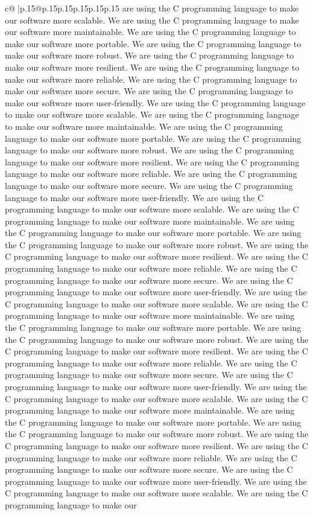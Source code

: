 \documentclass{article}
\begin{document}
{\begin{supertabular}{c@{$\;$}|p{.15\linewidth}@{}p{.15\linewidth}p{.15\linewidth}p{.15\linewidth}p{.15\linewidth}p{.15\linewidth}}
{{{are using the C programming language to make our software more scalable. We are using the C programming language to make our software more maintainable. We are using the C programming language to make our software more portable. We are using the C programming language to make our software more robust. We are using the C programming language to make our software more resilient. We are using the C programming language to make our software more reliable. We are using the C programming language to make our software more secure. We are using the C programming language to make our software more user-friendly. We are using the C programming language to make our software more scalable. We are using the C programming language to make our software more maintainable. We are using the C programming language to make our software more portable. We are using the C programming language to make our software more robust. We are using the C programming language to make our software more resilient. We are using the C programming language to make our software more reliable. We are using the C programming language to make our software more secure. We are using the C programming language to make our software more user-friendly. We are using the C programming language to make our software more scalable. We are using the C programming language to make our software more maintainable. We are using the C programming language to make our software more portable. We are using the C programming language to make our software more robust. We are using the C programming language to make our software more resilient. We are using the C programming language to make our software more reliable. We are using the C programming language to make our software more secure. We are using the C programming language to make our software more user-friendly. We are using the C programming language to make our software more scalable. We are using the C programming language to make our software more maintainable. We are using the C programming language to make our software more portable. We are using the C programming language to make our software more robust. We are using the C programming language to make our software more resilient. We are using the C programming language to make our software more reliable. We are using the C programming language to make our software more secure. We are using the C programming language to make our software more user-friendly. We are using the C programming language to make our software more scalable. We are using the C programming language to make our software more maintainable. We are using the C programming language to make our software more portable. We are using the C programming language to make our software more robust. We are using the C programming language to make our software more resilient. We are using the C programming language to make our software more reliable. We are using the C programming language to make our software more secure. We are using the C programming language to make our software more user-friendly. We are using the C programming language to make our software more scalable. We are using the C programming language to make our }}}
\end{supertabular}}
\end{document}
